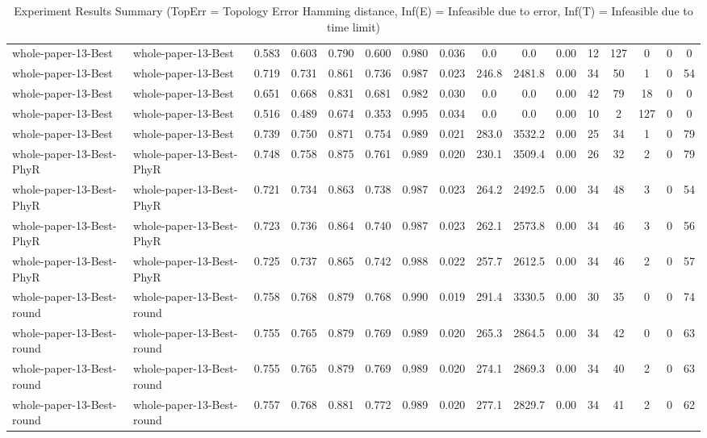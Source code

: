 \begin{table*}[p]
{\begin{tabular}{llcccccccccccccc}
      whole-paper-13-Best & whole-paper-13-Best & 0.583 & 0.603 & 0.790 & 0.600 & 0.980 & 0.036 & 0.0 & 0.0 & 0.00 & 12 & 127 & 0 & 0 & 0 \\
      whole-paper-13-Best & whole-paper-13-Best & 0.719 & 0.731 & 0.861 & 0.736 & 0.987 & 0.023 & 246.8 & 2481.8 & 0.00 & 34 & 50 & 1 & 0 & 54 \\
      whole-paper-13-Best & whole-paper-13-Best & 0.651 & 0.668 & 0.831 & 0.681 & 0.982 & 0.030 & 0.0 & 0.0 & 0.00 & 42 & 79 & 18 & 0 & 0 \\
      whole-paper-13-Best & whole-paper-13-Best & 0.516 & 0.489 & 0.674 & 0.353 & 0.995 & 0.034 & 0.0 & 0.0 & 0.00 & 10 & 2 & 127 & 0 & 0 \\
      whole-paper-13-Best & whole-paper-13-Best & 0.739 & 0.750 & 0.871 & 0.754 & 0.989 & 0.021 & 283.0 & 3532.2 & 0.00 & 25 & 34 & 1 & 0 & 79 \\
      whole-paper-13-Best-PhyR & whole-paper-13-Best-PhyR & 0.748 & 0.758 & 0.875 & 0.761 & 0.989 & 0.020 & 230.1 & 3509.4 & 0.00 & 26 & 32 & 2 & 0 & 79 \\
      whole-paper-13-Best-PhyR & whole-paper-13-Best-PhyR & 0.721 & 0.734 & 0.863 & 0.738 & 0.987 & 0.023 & 264.2 & 2492.5 & 0.00 & 34 & 48 & 3 & 0 & 54 \\
      whole-paper-13-Best-PhyR & whole-paper-13-Best-PhyR & 0.723 & 0.736 & 0.864 & 0.740 & 0.987 & 0.023 & 262.1 & 2573.8 & 0.00 & 34 & 46 & 3 & 0 & 56 \\
      whole-paper-13-Best-PhyR & whole-paper-13-Best-PhyR & 0.725 & 0.737 & 0.865 & 0.742 & 0.988 & 0.022 & 257.7 & 2612.5 & 0.00 & 34 & 46 & 2 & 0 & 57 \\
      whole-paper-13-Best-round & whole-paper-13-Best-round & 0.758 & 0.768 & 0.879 & 0.768 & 0.990 & 0.019 & 291.4 & 3330.5 & 0.00 & 30 & 35 & 0 & 0 & 74 \\
      whole-paper-13-Best-round & whole-paper-13-Best-round & 0.755 & 0.765 & 0.879 & 0.769 & 0.989 & 0.020 & 265.3 & 2864.5 & 0.00 & 34 & 42 & 0 & 0 & 63 \\
      whole-paper-13-Best-round & whole-paper-13-Best-round & 0.755 & 0.765 & 0.879 & 0.769 & 0.989 & 0.020 & 274.1 & 2869.3 & 0.00 & 34 & 40 & 2 & 0 & 63 \\
      whole-paper-13-Best-round & whole-paper-13-Best-round & 0.757 & 0.768 & 0.881 & 0.772 & 0.989 & 0.020 & 277.1 & 2829.7 & 0.00 & 34 & 41 & 2 & 0 & 62 \\
      \bottomrule
    \end{tabular}%
  }
  \caption{Experiment Results Summary (TopErr = Topology Error Hamming distance, Inf(E) = Infeasible due to error, Inf(T) = Infeasible due to time limit)}
  \label{tab:experiment-results}
\end{table*}